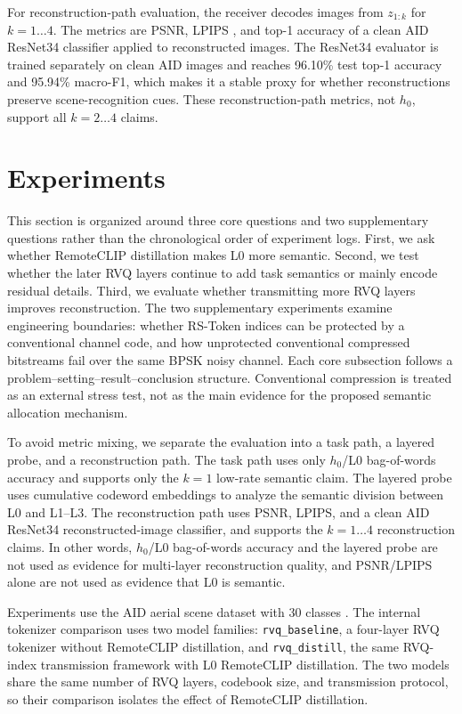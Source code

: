 \documentclass[lettersize,journal]{IEEEtran}
\begin{document}
For reconstruction-path evaluation, the receiver decodes images from $z_{1:k}$ for $k=1\ldots 4$. The metrics are PSNR, LPIPS \cite{zhang2018lpips}, and top-1 accuracy of a clean AID ResNet34 classifier applied to reconstructed images. The ResNet34 evaluator is trained separately on clean AID images and reaches 96.10\% test top-1 accuracy and 95.94\% macro-F1, which makes it a stable proxy for whether reconstructions preserve scene-recognition cues. These reconstruction-path metrics, not $h_0$, support all $k=2\ldots 4$ claims.

\section{Experiments}
This section is organized around three core questions and two supplementary questions rather than the chronological order of experiment logs. First, we ask whether RemoteCLIP distillation makes L0 more semantic. Second, we test whether the later RVQ layers continue to add task semantics or mainly encode residual details. Third, we evaluate whether transmitting more RVQ layers improves reconstruction. The two supplementary experiments examine engineering boundaries: whether RS-Token indices can be protected by a conventional channel code, and how unprotected conventional compressed bitstreams fail over the same BPSK noisy channel. Each core subsection follows a problem--setting--result--conclusion structure. Conventional compression is treated as an external stress test, not as the main evidence for the proposed semantic allocation mechanism.

To avoid metric mixing, we separate the evaluation into a task path, a layered probe, and a reconstruction path. The task path uses only $h_0$/L0 bag-of-words accuracy and supports only the $k=1$ low-rate semantic claim. The layered probe uses cumulative codeword embeddings to analyze the semantic division between L0 and L1--L3. The reconstruction path uses PSNR, LPIPS, and a clean AID ResNet34 reconstructed-image classifier, and supports the $k=1\ldots4$ reconstruction claims. In other words, $h_0$/L0 bag-of-words accuracy and the layered probe are not used as evidence for multi-layer reconstruction quality, and PSNR/LPIPS alone are not used as evidence that L0 is semantic.

Experiments use the AID aerial scene dataset with 30 classes \cite{xia2017aid}. The internal tokenizer comparison uses two model families: \texttt{rvq\_baseline}, a four-layer RVQ tokenizer without RemoteCLIP distillation, and \texttt{rvq\_distill}, the same RVQ-index transmission framework with L0 RemoteCLIP distillation. The two models share the same number of RVQ layers, codebook size, and transmission protocol, so their comparison isolates the effect of RemoteCLIP distillation.
\end{document}
